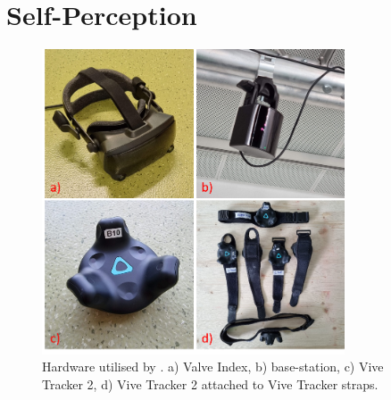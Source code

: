 \section{Self-Perception}
\label{sec:selfperception}
\begin{figure}[H]
	\centering
	\includegraphics[width=0.8\textwidth]{figures/hardware.png}
	\caption[Hardware]{Hardware utilised by \exgo. a) Valve Index, b) base-station, c) Vive Tracker 2, d) Vive Tracker 2 attached to Vive Tracker straps.}
	\label{fig:hardware}
\end{figure}

